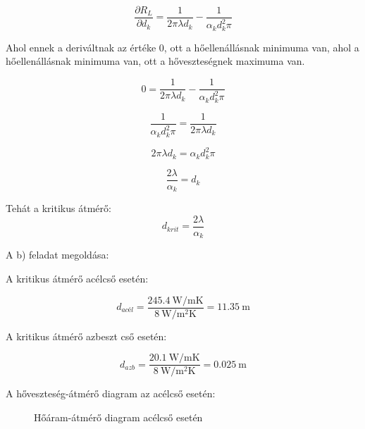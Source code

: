 \begin{equation}
	\frac{\partial R_L}{\partial d_k} = \frac{1}{2 \pi \lambda d_k} - \frac{1}{\alpha_k d_k^2 \pi}
\end{equation}

Ahol ennek a deriváltnak az értéke \(0\), ott a hőellenállásnak minimuma van, ahol a hőellenállásnak minimuma van, ott a hőveszteségnek maximuma van.

\[0 = \frac{1}{2 \pi \lambda d_k}-\frac{1}{\alpha_k d_k^2 \pi}\]

\[\frac{1}{\alpha_k d_k^2 \pi} = \frac{1}{2 \pi \lambda d_k}\]

\[2 \pi \lambda d_k = \alpha_k d_k^2 \pi\]

\[\frac{2 \lambda}{\alpha_k} = d_k\]

Tehát a kritikus átmérő:
\begin{equation}
	d_{krit} = \frac{2 \lambda}{\alpha_k}
\end{equation}

A b) feladat megoldása:

A kritikus átmérő acélcső esetén:

\[d_{\textit{acél}} = \frac{2 \SI{45,4}{\watt\per\meter\kelvin}}{\SI{8}{\watt\per\meter\squared\kelvin}} = \SI{11,35}{\meter}\]

A kritikus átmérő azbeszt cső esetén:

\[d_{azb} = \frac{2 \SI{0,1}{\watt\per\meter\kelvin}}{\SI{8}{\watt\per\meter\squared\kelvin}} = \SI{0,025}{\meter}\]

A hőveszteség-átmérő diagram az acélcső esetén:

\begin{figure}[h]
	\centering
	\label{figure:guh7ud-vgpvd}
	\caption{Hőáram-átmérő diagram acélcső esetén}
\end{figure}

